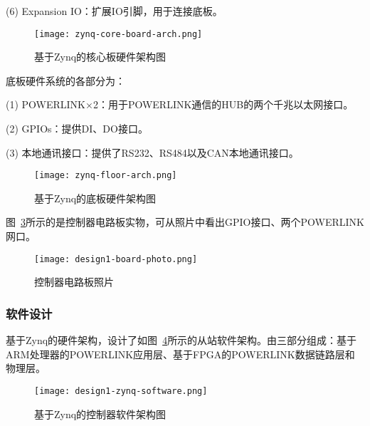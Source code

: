 (6) Expansion IO：扩展IO引脚，用于连接底板。

\begin{figure}[!htb]
	\centering
	\texttt{[image: zynq-core-board-arch.png]}
	\caption{基于Zynq的核心板硬件架构图}
	\label{fig:zynq-core-board-arch}
\end{figure}


底板硬件系统的各部分为：

(1) POWERLINK×2：用于POWERLINK通信的HUB的两个千兆以太网接口。

(2) GPIOs：提供DI、DO接口。

(3) 本地通讯接口：提供了RS232、RS484以及CAN本地通讯接口。

\begin{figure}[!htb]
	\centering
	\texttt{[image: zynq-floor-arch.png]}
	\caption{基于Zynq的底板硬件架构图}
	\label{fig:zynq-floor-arch}
\end{figure}

图~\ref{fig:design1-board-photo}所示的是控制器电路板实物，可从照片中看出GPIO接口、两个POWERLINK网口。

\begin{figure}[!htb]
	\centering
	\texttt{[image: design1-board-photo.png]}
	\caption{控制器电路板照片}
	\label{fig:design1-board-photo}
\end{figure}

\subsubsection{软件设计}

基于Zynq的硬件架构，设计了如图~\ref{fig:design1-zynq-software}所示的从站软件架构。由三部分组成：基于ARM处理器的POWERLINK应用层、基于FPGA的POWERLINK数据链路层和物理层。

\begin{figure}[!htb]
  \centering
  \texttt{[image: design1-zynq-software.png]}
  \caption{基于Zynq的控制器软件架构图}
  \label{fig:design1-zynq-software}
\end{figure}

